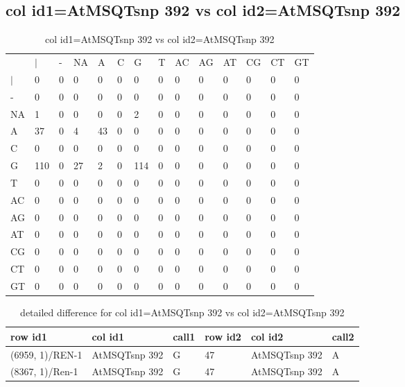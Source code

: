 \subsection{col id1=AtMSQTsnp 392 vs col id2=AtMSQTsnp 392}
\begin{center}
\begin{longtable}{|l|l|l|l|l|l|l|l|l|l|l|l|l|l|}
\caption{col id1=AtMSQTsnp 392 vs col id2=AtMSQTsnp 392} \label{table_dm898}\\
\hline
\\
\hline
&$|$&-&NA&A&C&G&T&AC&AG&AT&CG&CT&GT\\
$|$&0&0&0&0&0&0&0&0&0&0&0&0&0\\
-&0&0&0&0&0&0&0&0&0&0&0&0&0\\
NA&1&0&0&0&0&2&0&0&0&0&0&0&0\\
A&37&0&4&43&0&0&0&0&0&0&0&0&0\\
C&0&0&0&0&0&0&0&0&0&0&0&0&0\\
G&110&0&27&2&0&114&0&0&0&0&0&0&0\\
T&0&0&0&0&0&0&0&0&0&0&0&0&0\\
AC&0&0&0&0&0&0&0&0&0&0&0&0&0\\
AG&0&0&0&0&0&0&0&0&0&0&0&0&0\\
AT&0&0&0&0&0&0&0&0&0&0&0&0&0\\
CG&0&0&0&0&0&0&0&0&0&0&0&0&0\\
CT&0&0&0&0&0&0&0&0&0&0&0&0&0\\
GT&0&0&0&0&0&0&0&0&0&0&0&0&0\\
\hline
\end{longtable}
\end{center}

\begin{center}
\begin{longtable}{|l|l|l|l|l|l|}
\caption{detailed difference for col id1=AtMSQTsnp 392 vs col id2=AtMSQTsnp 392} \label{table_dm899}\\
\hline
row id1&col id1&call1&row id2&col id2&call2\\
\hline
(6959, 1)/REN-1&AtMSQTsnp 392&G&47&AtMSQTsnp 392&A\\
(8367, 1)/Ren-1&AtMSQTsnp 392&G&47&AtMSQTsnp 392&A\\
\hline
\end{longtable}
\end{center}

